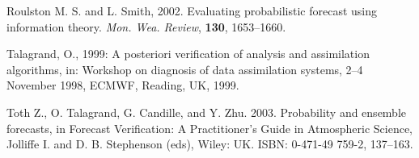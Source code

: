 \documentclass[11pt]{article}
\begin{document}
\begin{thebibliography}{}
Roulston M. S. and L. Smith, 2002. Evaluating probabilistic forecast using information theory. {\it Mon. Wea. Review}, {\bf 130}, 1653--1660.

Talagrand, O., 1999:
A posteriori verification of analysis and assimilation algorithms,
in: Workshop on diagnosis of data assimilation systems,
2--4 November 1998, ECMWF, Reading, UK, 1999.

Toth Z., O. Talagrand, G. Candille, and Y. Zhu. 2003. Probability and ensemble forecasts,  in Forecast Verification: A Practitioner's Guide in Atmospheric Science, Jolliffe I. and D. B. Stephenson (eds), Wiley: UK. ISBN: 0-471-49 759-2, 137--163.

\end{thebibliography}
\end{document}
